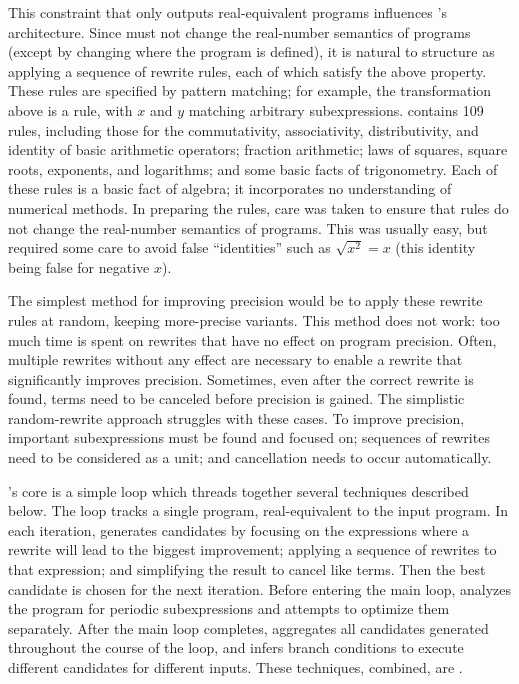 \documentclass[paper.tex]{subfiles}
\begin{document}
This constraint that \casio only outputs real-equivalent programs
  influences \casio's architecture.
Since \casio must not change the real-number semantics of programs
  (except by changing where the program is defined),
  it is natural to structure \casio
  as applying a sequence of rewrite rules,
  each of which satisfy the above property.
These rules are specified by pattern matching;
  for example, the transformation above is a rule,
  with $x$ and $y$ matching arbitrary subexpressions.
\casio contains 109 rules,
  including those for
  the commutativity, associativity, distributivity, and identity
  of basic arithmetic operators;
  fraction arithmetic;
  laws of squares, square roots, exponents, and logarithms;
  and some basic facts of trigonometry.
Each of these rules is a basic fact of algebra;
  it incorporates no understanding of numerical methods.
In preparing the rules,
  care was taken to ensure that rules
  do not change the real-number semantics of programs.
This was usually easy, but required some care
  to avoid false ``identities'' such as $\sqrt{x^2} = x$
  (this identity being false for negative $x$).

The simplest method for improving precision
  would be to apply these rewrite rules at random,
  keeping more-precise variants.
This method does not work:
  too much time is spent on rewrites
  that have no effect on program precision.
Often, multiple rewrites without any effect
  are necessary to enable a rewrite that significantly improves precision.
Sometimes, even after the correct rewrite is found,
  terms need to be canceled before precision is gained.
The simplistic random-rewrite approach struggles with these cases.
To improve precision, important subexpressions
  must be found and focused on;
  sequences of rewrites need to be considered as a unit;
  and cancellation needs to occur automatically.

\casio's core is a simple loop
  which threads together several techniques described below.
The loop tracks a single program,
  real-equivalent to the input program.
In each iteration, \casio generates candidates
  by focusing on the expressions where a rewrite
  will lead to the biggest improvement;
  applying a sequence of rewrites to that expression;
  and simplifying the result to cancel like terms.
Then the best candidate is chosen for the next iteration.
Before entering the main loop,
  \casio analyzes the program for periodic subexpressions
  and attempts to optimize them separately.
After the main loop completes,
  \casio aggregates all candidates generated
  throughout the course of the loop,
  and infers branch conditions
  to execute different candidates for different inputs.
These techniques, combined, are \casio.
\end{document}
